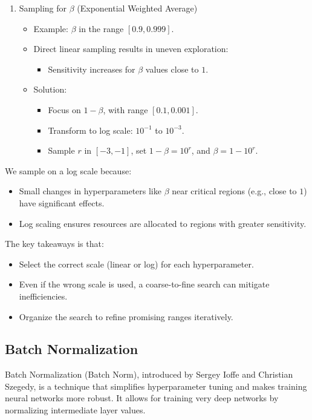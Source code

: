 \documentclass[letterpaper,12pt,notitlepage,twoside]{report}
\begin{document}
\begin{enumerate}[noitemsep, topsep=0pt]
\item Sampling for $\beta$ (Exponential Weighted Average)
\begin{itemize}
    \item Example: $\beta$ in the range $[0.9, 0.999]$.
    \item Direct linear sampling results in uneven exploration:
    \begin{itemize}
        \item Sensitivity increases for $\beta$ values close to $1$.
    \end{itemize}
    \item Solution:
    \begin{itemize}
        \item Focus on $1 - \beta$, with range $[0.1, 0.001]$.
        \item Transform to log scale: $10^{-1}$ to $10^{-3}$.
        \item Sample $r$ in $[-3, -1]$, set $1 - \beta = 10^r$, and $\beta = 1 - 10^r$.
    \end{itemize}
\end{itemize}
\end{enumerate}

We sample on a log scale because:
\begin{itemize}[noitemsep, topsep=0pt]
    \item Small changes in hyperparameters like $\beta$ near critical regions (e.g., close to $1$) have significant effects.
    \item Log scaling ensures resources are allocated to regions with greater sensitivity.
\end{itemize}

The key takeaways is that:
\begin{itemize}[noitemsep, topsep=0pt]
    \item Select the correct scale (linear or log) for each hyperparameter.
    \item Even if the wrong scale is used, a coarse-to-fine search can mitigate inefficiencies.
    \item Organize the search to refine promising ranges iteratively.
\end{itemize}

\subsection{Batch Normalization}
Batch Normalization (Batch Norm), introduced by Sergey Ioffe and Christian Szegedy, is a technique that simplifies hyperparameter tuning and makes training neural networks more robust. It allows for training very deep networks by normalizing intermediate layer values.
\end{document}

